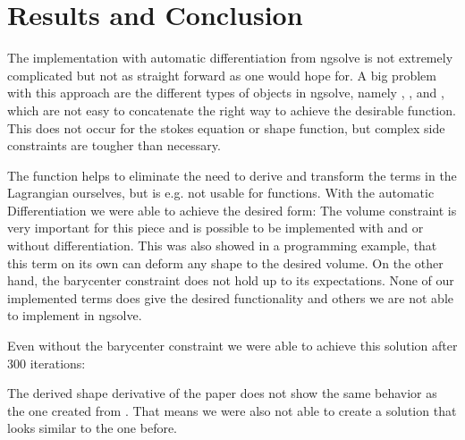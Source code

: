 \section{Results and Conclusion}
The implementation with automatic differentiation from ngsolve is not extremely complicated but not as straight forward as one would hope for. A big problem with this approach are the different types of objects in ngsolve, namely , ,  and , which are not easy to concatenate the right way to achieve the desirable function.
This does not occur for the stokes equation or shape function, but complex side constraints are tougher than necessary.

The  function helps to eliminate the need to derive and transform the terms in the Lagrangian ourselves, but is e.g. not usable for  functions. 
With the automatic Differentiation we were able to achieve the desired form:
The volume constraint is very important for this piece and is possible to be implemented with and or without differentiation. This was also showed in a programming example, that this term on its own can deform any shape to the desired volume.
On the other hand, the barycenter constraint does not hold up to its expectations. None of our implemented terms does give the desired functionality and others we are not able to implement in ngsolve.

Even without the barycenter constraint we were able to achieve this solution after 300 iterations:


The derived shape derivative of the paper \cite{nearly_conformal_paper} does not show the same behavior as the one created from . That means we were also not able to create a solution that looks similar to the one before.

